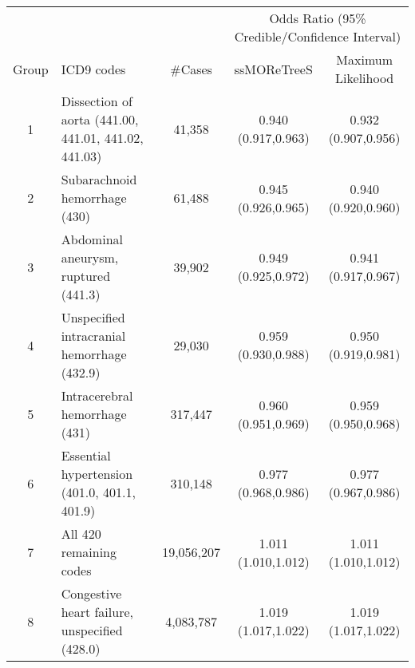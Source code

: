 \begin{tabular}{cp{3cm}ccc}
  \hline
  & & & \multicolumn{2}{c}{Odds Ratio (95\% Credible/Confidence Interval)} \\
Group & ICD9 codes & \#Cases &  ssMOReTreeS & Maximum Likelihood \\ 
  \hline
1 & Dissection of aorta (441.00, 441.01, 441.02, 441.03) & 41,358 & 0.940 (0.917,0.963) & 0.932 (0.907,0.956) \\ 
  2 & Subarachnoid hemorrhage (430) & 61,488 & 0.945 (0.926,0.965) & 0.940 (0.920,0.960) \\ 
  3 & Abdominal aneurysm, ruptured (441.3) & 39,902 & 0.949 (0.925,0.972) & 0.941 (0.917,0.967) \\ 
  4 & Unspecified intracranial hemorrhage (432.9) & 29,030 & 0.959 (0.930,0.988) & 0.950 (0.919,0.981) \\ 
  5 & Intracerebral hemorrhage (431) & 317,447 & 0.960 (0.951,0.969) & 0.959 (0.950,0.968) \\ 
  6 & Essential hypertension (401.0, 401.1, 401.9) & 310,148 & 0.977 (0.968,0.986) & 0.977 (0.967,0.986) \\ 
  7 & All 420 remaining codes & 19,056,207 & 1.011 (1.010,1.012) & 1.011 (1.010,1.012) \\ 
  8 & Congestive heart failure, unspecified (428.0) & 4,083,787 & 1.019 (1.017,1.022) & 1.019 (1.017,1.022) \\ 
   \hline
\end{tabular}

